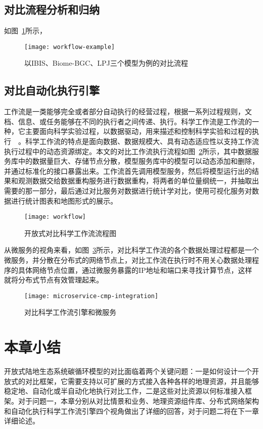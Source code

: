 \subsection{对比流程分析和归纳}
如图~\ref{fig:workflow-example}所示，

\begin{figure}[!htbp]
    \centering
    \texttt{[image: workflow-example]}
    \caption{以IBIS、Biome-BGC、LPJ三个模型为例的对比流程}
    \label{fig:workflow-example}
\end{figure}

\subsection{对比自动化执行引擎}
工作流是一类能够完全或者部分自动执行的经营过程，根据一系列过程规则，文档、信息、或任务能够在不同的执行者之间传递、执行。科学工作流是工作流的一种，它主要面向科学实验过程，以数据驱动，用来描述和控制科学实验和过程的执行~\cite{ludascher2006scientific}~\cite{Zhao2009Special}。科学工作流的特点是面向数据、数据规模大、具有动态适应性以支持工作流执行过程中的动态资源绑定。本文的对比工作流执行流程如图~\ref{fig:workflow}所示，其中数据服务库中的数据量巨大、存储节点分散，模型服务库中的模型可以动态添加和删除，并通过标准化的接口暴露出来。工作流首先调用模型服务，然后将模型运行出的结果和观测数据交给数据重构服务进行数据重构，将两者的单位量纲统一，并抽取出需要的那一部分，最后通过对比服务对数据进行统计学对比，使用可视化服务对数据进行统计图表和地图形式的展示。

\begin{figure}[!htbp]
    \centering
    \texttt{[image: workflow]}
    \caption{开放式对比科学工作流流程图}
    \label{fig:workflow}
\end{figure}

从微服务的视角来看，如图~\ref{fig:microservice-cmp-integration}所示，对比科学工作流的各个数据处理过程都是一个微服务，并分散在分布式的网络节点上，对比工作流在执行时不用关心数据处理程序的具体网络节点位置，通过微服务暴露的IP地址和端口来寻找计算节点，这样就将分布式节点有效管理起来。

\begin{figure}[!htbp]
    \centering
    \texttt{[image: microservice-cmp-integration]}
    \caption{对比科学工作流引擎和微服务}
    \label{fig:microservice-cmp-integration}
\end{figure}


\section{本章小结}
开放式陆地生态系统碳循环模型的对比面临着两个关键问题：一是如何设计一个开放式的对比框架，它需要支持以可扩展的方式接入各种各样的地理资源，并且能够稳定地、自动化或半自动化地执行对比工作，二是这些对比资源以何标准接入框架。对于问题一，本章分别从对比情景和业务、地理资源组件库、分布式网络架构和自动化执行科学工作流引擎四个视角做出了详细的回答，对于问题二将在下一章详细论述。